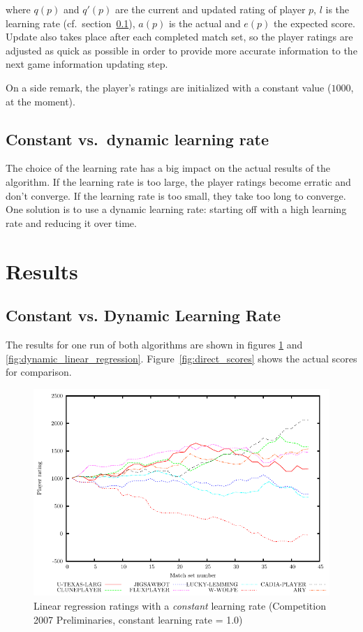 \documentclass[a4paper,10pt]{article}
\begin{document}
where $q(p)$ and $q'(p)$ are the current and updated rating of player $p$, $l$ is the learning rate (cf.\ section~\ref{sec:constant_dynamic}), $a(p)$ is the actual and $e(p)$ the expected score. Update also takes place after each completed match set, so the player ratings are adjusted as quick as possible in order to provide more accurate information to the next game information updating step.

On a side remark, the player's ratings are initialized with a constant value ($1000$, at the moment).


\subsection{Constant vs.\ dynamic learning rate}
\label{sec:constant_dynamic}

The choice of the learning rate has a big impact on the actual results of the algorithm. If the learning rate is too large, the player ratings become erratic and don't converge. If the learning rate is too small, they take too long to converge. One solution is to use a dynamic learning rate: starting off with a high learning rate and reducing it over time.

\section{Results}

\subsection{Constant vs. Dynamic Learning Rate}
The results for one run of both algorithms are shown in figures \ref{fig:constant_linear_regression} and \ref{fig:dynamic_linear_regression}. Figure~\ref{fig:direct_scores} shows the actual scores for comparison.

\begin{figure}
 \centering
 \includegraphics[width=\textwidth]{constant_linear_regression_1_0}
 \caption{Linear regression ratings with a \textit{constant} learning rate (Competition 2007 Preliminaries, constant learning rate = 1.0)}
 \label{fig:constant_linear_regression}
\end{figure}
\end{document}
